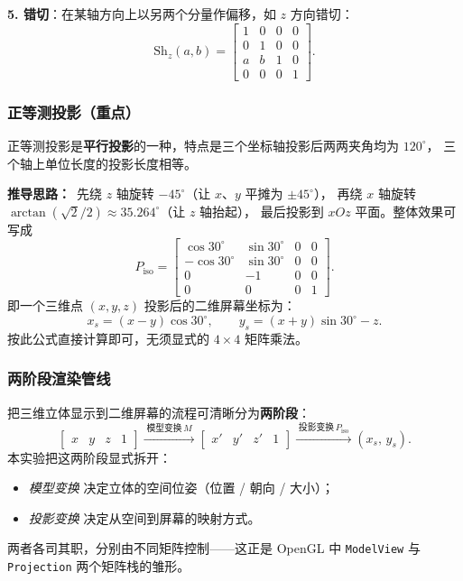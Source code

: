 \documentclass[a4paper,12pt]{ctexart}
\begin{document}
\textbf{5. 错切}：在某轴方向上以另两个分量作偏移，如 $z$ 方向错切：
\[
    \mathrm{Sh}_z(a,b) =
    \begin{bmatrix}
        1 & 0 & 0 & 0 \\
        0 & 1 & 0 & 0 \\
        a & b & 1 & 0 \\
        0 & 0 & 0 & 1
    \end{bmatrix}.
\]

\subsubsection{正等测投影（重点）}

正等测投影是\textbf{平行投影}的一种，特点是三个坐标轴投影后两两夹角均为 $120^\circ$，
三个轴上单位长度的投影长度相等。

\textbf{推导思路：}\ 先绕 $z$ 轴旋转 $-45^\circ$（让 $x$、$y$ 平摊为 $\pm 45^\circ$），
再绕 $x$ 轴旋转 $\arctan(\sqrt{2}/2)\approx 35.264^\circ$（让 $z$ 轴抬起），
最后投影到 $xOz$ 平面。整体效果可写成
\[
    P_\text{iso} =
    \begin{bmatrix}
        \cos 30^\circ & \sin 30^\circ & 0 & 0 \\
       -\cos 30^\circ & \sin 30^\circ & 0 & 0 \\
        0             & -1            & 0 & 0 \\
        0             & 0             & 0 & 1
    \end{bmatrix}.
\]
即一个三维点 $(x,y,z)$ 投影后的二维屏幕坐标为：
\[
    \boxed{\;
        x_s = (x-y)\cos 30^\circ,\qquad
        y_s = (x+y)\sin 30^\circ - z .\;}
\]
按此公式直接计算即可，无须显式的 $4\times 4$ 矩阵乘法。

\subsubsection{两阶段渲染管线}

把三维立体显示到二维屏幕的流程可清晰分为\textbf{两阶段}：
\[
    \begin{bmatrix} x & y & z & 1 \end{bmatrix}
    \xrightarrow{\;\text{模型变换}\,M\;}
    \begin{bmatrix} x' & y' & z' & 1 \end{bmatrix}
    \xrightarrow{\;\text{投影变换}\,P_\text{iso}\;}
    (x_s,\,y_s).
\]
本实验把这两阶段显式拆开：
\begin{itemize}[leftmargin=2em,itemsep=0.1em]
    \item \emph{模型变换} 决定立体的空间位姿（位置 / 朝向 / 大小）；
    \item \emph{投影变换} 决定从空间到屏幕的映射方式。
\end{itemize}
两者各司其职，分别由不同矩阵控制——这正是 OpenGL 中 \texttt{ModelView} 与
\texttt{Projection} 两个矩阵栈的雏形。
\end{document}
